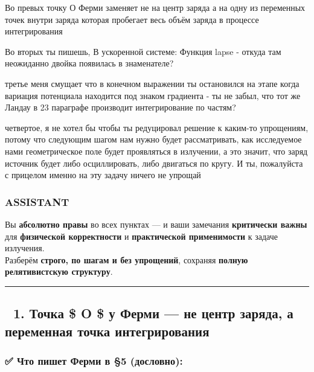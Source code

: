 \documentclass[11pt]{article}
\begin{document}
Во превых точку О Ферми заменяет не на центр заряда а на одну из
переменных точек внутри заряда которая пробегает весь объём заряда в
процессе интегрирования

Во вторых ты пишешь, В ускоренной системе: Функция lapse - откуда там
неожиданно двойка появилась в знаменателе?

третье меня смущает что в конечном выражении ты остановился на этапе
когда вариация потенциала находится под знаком градиента - ты не забыл,
что тот же Ландау в 23 параграфе производит интегрирование по частям?

четвертое, я не хотел бы чтобы ты редуцировал решение к каким-то
упрощениям, потому что следующим шагом нам нужно будет рассматривать,
как исследуемое нами геометрическое поле будет проявляться в излучении,
а это значит, что заряд источник будет либо осциллировать, либо
двигаться по кругу. И ты, пожалуйста с прицелом именно на эту задачу
ничего не упрощай

\subsubsection{ASSISTANT}\label{assistant-8}

Вы \textbf{абсолютно правы} во всех пунктах --- и ваши замечания
\textbf{критически важны} для \textbf{физической корректности} и
\textbf{практической применимости} к задаче излучения.\\
Разберём \textbf{строго, по шагам и без упрощений}, сохраняя
\textbf{полную релятивистскую структуру}.

\begin{center}\rule{0.5\linewidth}{\linethickness}\end{center}

\subsection{🔹 1. Точка \$ O \$ у Ферми --- не центр заряда, а переменная
точка
интегрирования}\label{ux442ux43eux447ux43aux430-o-ux443-ux444ux435ux440ux43cux438-ux43dux435-ux446ux435ux43dux442ux440-ux437ux430ux440ux44fux434ux430-ux430-ux43fux435ux440ux435ux43cux435ux43dux43dux430ux44f-ux442ux43eux447ux43aux430-ux438ux43dux442ux435ux433ux440ux438ux440ux43eux432ux430ux43dux438ux44f}

\subsubsection{✅ Что пишет Ферми в §5
(дословно):}\label{ux447ux442ux43e-ux43fux438ux448ux435ux442-ux444ux435ux440ux43cux438-ux432-5-ux434ux43eux441ux43bux43eux432ux43dux43e}
\end{document}
